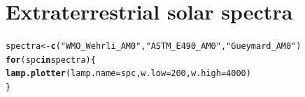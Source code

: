 \documentclass{article}\usepackage[]{graphicx}\usepackage[]{color}
\makeatletter
\newcommand{\hlnum}[1]{\textcolor[rgb]{0.686,0.059,0.569}{#1}}%
\newcommand{\hlstr}[1]{\textcolor[rgb]{0.192,0.494,0.8}{#1}}%
\newcommand{\hlstd}[1]{\textcolor[rgb]{0.345,0.345,0.345}{#1}}%
\newcommand{\hlkwa}[1]{\textcolor[rgb]{0.161,0.373,0.58}{\textbf{#1}}}%
\newcommand{\hlkwb}[1]{\textcolor[rgb]{0.69,0.353,0.396}{#1}}%
\newcommand{\hlkwc}[1]{\textcolor[rgb]{0.333,0.667,0.333}{#1}}%
\newcommand{\hlkwd}[1]{\textcolor[rgb]{0.737,0.353,0.396}{\textbf{#1}}}%
\newenvironment{kframe}{%
 \def\at@end@of@kframe{}%
 \ifinner\ifhmode%
  \def\at@end@of@kframe{\end{minipage}}%
  \begin{minipage}{\columnwidth}%
 \fi\fi%
 \def\FrameCommand##1{\hskip\@totalleftmargin \hskip-\fboxsep
 \colorbox{shadecolor}{##1}\hskip-\fboxsep
     \hskip-\linewidth \hskip-\@totalleftmargin \hskip\columnwidth}%
 \MakeFramed {\advance\hsize-\width
   \@totalleftmargin\z@ \linewidth\hsize
   \@setminipage}}%
 {\par\unskip\endMakeFramed%
 \at@end@of@kframe}
\newenvironment{knitrout}{}{} %
\makeatother
\begin{document}
\section{Extraterrestrial solar spectra}

\begin{knitrout}\footnotesize
{}\color{fgcolor}\begin{kframe}
\begin{alltt}
\hlstd{spectra} \hlkwb{<-} \hlkwd{c}\hlstd{(}\hlstr{"WMO_Wehrli_AM0"}\hlstd{,} \hlstr{"ASTM_E490_AM0"}\hlstd{,} \hlstr{"Gueymard_AM0"}\hlstd{)}
\hlkwa{for} \hlstd{(spc} \hlkwa{in} \hlstd{spectra) \{}
    \hlkwd{lamp.plotter}\hlstd{(}\hlkwc{lamp.name} \hlstd{= spc,} \hlkwc{w.low} \hlstd{=} \hlnum{200}\hlstd{,} \hlkwc{w.high} \hlstd{=} \hlnum{4000}\hlstd{)}
\hlstd{\}}
\end{alltt}
\end{kframe}


\end{knitrout}
\end{document}
